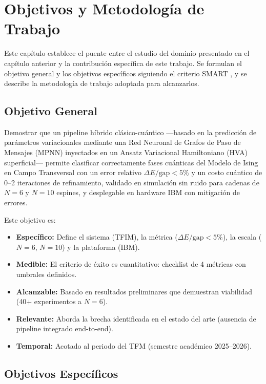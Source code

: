 \documentclass[11pt,a4paper,spanish]{book}
\begin{document}
\chapter{Objetivos y Metodología de Trabajo}

Este capítulo establece el puente entre el estudio del dominio presentado en el capítulo anterior y la contribución específica de este trabajo. Se formulan el objetivo general y los objetivos específicos siguiendo el criterio SMART \citep{doran1981}, y se describe la metodología de trabajo adoptada para alcanzarlos.

\section{Objetivo General}

Demostrar que un pipeline híbrido clásico-cuántico ---basado en la predicción de parámetros variacionales mediante una Red Neuronal de Grafos de Paso de Mensajes (MPNN) inyectados en un Ansatz Variacional Hamiltoniano (HVA) superficial--- permite clasificar correctamente fases cuánticas del Modelo de Ising en Campo Transversal con un error relativo $\Delta E/\text{gap} < 5\%$ y un costo cuántico de 0--2 iteraciones de refinamiento, validado en simulación sin ruido para cadenas de $N = 6$ y $N = 10$ espines, y desplegable en hardware IBM con mitigación de errores.

Este objetivo es:
\begin{itemize}
    \item \textbf{Específico:} Define el sistema (TFIM), la métrica ($\Delta E/\text{gap} < 5\%$), la escala ($N = 6$, $N = 10$) y la plataforma (IBM).
    \item \textbf{Medible:} El criterio de éxito es cuantitativo: checklist de 4 métricas con umbrales definidos.
    \item \textbf{Alcanzable:} Basado en resultados preliminares que demuestran viabilidad (40+ experimentos a $N = 6$).
    \item \textbf{Relevante:} Aborda la brecha identificada en el estado del arte (ausencia de pipeline integrado end-to-end).
    \item \textbf{Temporal:} Acotado al periodo del TFM (semestre académico 2025--2026).
\end{itemize}

\section{Objetivos Específicos}
\end{document}
